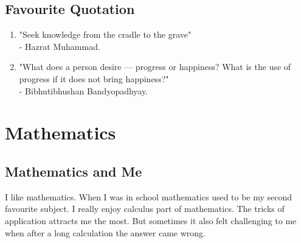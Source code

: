 \documentclass[12pt]{article}
\begin{document}
\subsection{Favourite Quotation}
\begin{enumerate} 
    \item "Seek knowledge from the cradle to the grave"\\
    - Hazrat Muhammad.
    \item "What does a person desire --- progress or happiness? What is the use of progress if it does not bring happiness?"\\
    - Bibhutibhushan Bandyopadhyay.
    \end{enumerate}
    \section{Mathematics}

\subsection{Mathematics and Me}
I like mathematics. When I was in school mathematics used to be my second favourite subject. I really enjoy calculus part of mathematics. The tricks of application attracts me the most. But sometimes it also felt challenging to me when after a long calculation the answer came wrong.
\end{document}
